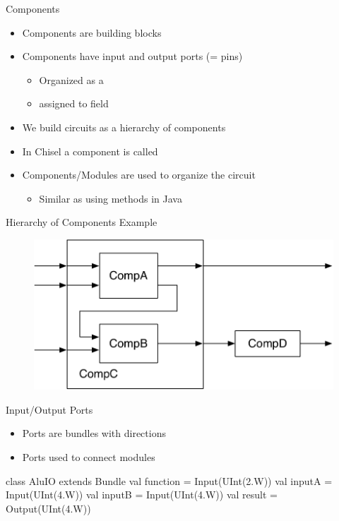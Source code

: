 \begin{frame}[fragile]{Components}
\begin{itemize}
\item Components are building blocks
\item Components have input and output ports (= pins)
\begin{itemize}
\item Organized as a 
\item assigned to field 
\end{itemize}
\item We build circuits as a hierarchy of components
\item In Chisel a component is called 
\item Components/Modules are used to organize the circuit
\begin{itemize}
\item Similar as using methods in Java
\end{itemize}
\end{itemize}
\end{frame}

\begin{frame}[fragile]{Hierarchy of Components Example}
\begin{figure}
  \includegraphics[scale=\scale]{../figures/components}
\end{figure}
\end{frame}


\begin{frame}[fragile]{Input/Output Ports}
\begin{itemize}
\item Ports are bundles with directions
\item Ports used to connect modules
\end{itemize}
\begin{chisel}
class AluIO extends Bundle {
  val function = Input(UInt(2.W))
  val inputA = Input(UInt(4.W))
  val inputB = Input(UInt(4.W))
  val result = Output(UInt(4.W))
}
\end{chisel}
\end{frame}


